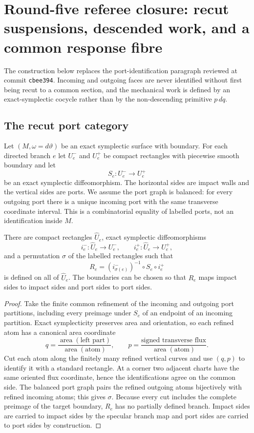 \section{Round-five referee closure: recut suspensions, descended work, and a common response fibre}
\label{sec:r5-a1}

The construction below replaces the port-identification paragraph reviewed at
commit \texttt{cbee394}.  Incoming and outgoing faces are never identified
without first being recut to a common section, and the mechanical work is
defined by an exact-symplectic cocycle rather than by the non-descending
primitive \(p\,dq\).

\subsection{The recut port category}

Let \((M,\omega=d\vartheta)\) be an exact symplectic surface with boundary.
For each directed branch \(e\) let \(U_e^-\) and \(U_e^+\) be compact
rectangles with piecewise smooth boundary and let
\[
 S_e:U_e^-\longrightarrow U_e^+
\]
be an exact symplectic diffeomorphism.  The horizontal sides are impact walls
and the vertical sides are ports.  We assume the port graph is balanced: for
every outgoing port there is a unique incoming port with the same transverse
coordinate interval.  This is a combinatorial equality of labelled ports,
not an identification inside \(M\).

\begin{lemma}
\label{lem:r5-a1-recut}
There are compact rectangles \(\widehat U_e\), exact symplectic
diffeomorphisms
\[
 i_e^-:\widehat U_e\to U_e^-,
 \qquad
 i_e^+:\widehat U_e\to U_e^+,
\]
and a permutation \(\sigma\) of the labelled rectangles such that
\[
 R_e=(i_{\sigma(e)}^-)^{-1}\circ S_e\circ i_e^+
\]
is defined on all of \(\widehat U_e\).  The boundaries can be chosen so that
\(R_e\) maps impact sides to impact sides and port sides to port sides.
\end{lemma}

\begin{proof}
Take the finite common refinement of the incoming and outgoing port
partitions, including every preimage under \(S_e\) of an endpoint of an
incoming partition.  Exact symplecticity preserves area and orientation, so
each refined atom has a canonical area coordinate
\[
 q=\frac{\operatorname{area}(\text{left part})}
          {\operatorname{area}(\text{atom})},
 \qquad
 p=\frac{\text{signed transverse flux}}{\operatorname{area}(\text{atom})}.
\]
Cut each atom along the finitely many refined vertical curves and use
\((q,p)\) to identify it with a standard rectangle.  At a corner two adjacent
charts have the same oriented flux coordinate, hence the identifications
agree on the common side.  The balanced port graph pairs the refined outgoing
atoms bijectively with refined incoming atoms; this gives \(\sigma\).
Because every cut includes the complete preimage of the target boundary,
\(R_e\) has no partially defined branch.  Impact sides are carried to impact
sides by the specular branch map and port sides are carried to port sides by
construction.
\end{proof}

